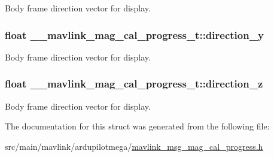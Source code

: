 Body frame direction vector for display. 

\hypertarget{struct____mavlink__mag__cal__progress__t_aa6d29bfcbbc29992ad49decba3ebfaca}{
\subsubsection[{direction\+\_\+y}]{\setlength{\rightskip}{0pt plus 5cm}float \+\_\+\+\_\+mavlink\+\_\+mag\+\_\+cal\+\_\+progress\+\_\+t\+::direction\+\_\+y}}\label{struct____mavlink__mag__cal__progress__t_aa6d29bfcbbc29992ad49decba3ebfaca}


Body frame direction vector for display. 

\hypertarget{struct____mavlink__mag__cal__progress__t_af156578adf97e273af5b880655c0f142}{
\subsubsection[{direction\+\_\+z}]{\setlength{\rightskip}{0pt plus 5cm}float \+\_\+\+\_\+mavlink\+\_\+mag\+\_\+cal\+\_\+progress\+\_\+t\+::direction\+\_\+z}}\label{struct____mavlink__mag__cal__progress__t_af156578adf97e273af5b880655c0f142}


Body frame direction vector for display. 



The documentation for this struct was generated from the following file\+:\begin{DoxyCompactItemize}
\item 
src/main/mavlink/ardupilotmega/\hyperlink{mavlink__msg__mag__cal__progress_8h}{mavlink\+\_\+msg\+\_\+mag\+\_\+cal\+\_\+progress.\+h}\end{DoxyCompactItemize}
